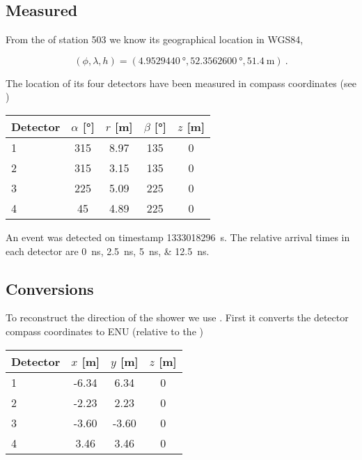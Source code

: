 \subsection{Measured}

From the \gps of station 503 we know its geographical location in WGS84,

\begin{equation}
    (\phi, \lambda, h) = (\SI{4.9529440}{\degree},
                          \SI{52.3562600}{\degree},
                          \SI{51.4}{\meter}) \ .
\end{equation}

The location of its four detectors have been measured in compass
coordinates (see )

\begin{center}
    \begin{tabular}{ l c c c c }
        \toprule
        Detector & $\alpha$ [\si{\degree}] & $r$ [\si{\meter}] &
        $\beta$ [\si{\degree}] & $z$ [\si{\meter}] \\
        \midrule
        1 & 315 & 8.97 & 135 & 0 \\
        2 & 315 & 3.15 & 135 & 0 \\
        3 & 225 & 5.09 & 225 & 0 \\
        4 &  45 & 4.89 & 225 & 0 \\
        \bottomrule
    \end{tabular}
\end{center}
                        
An event was detected on \gps timestamp \SI{1333018296}{\second}. The
relative arrival times in each detector are
\SIlist{0;2.5;5;12.5}{\nano\second}.


\subsection{Conversions}

To reconstruct the direction of the shower we use \sapphire. First it
converts the detector compass coordinates to ENU (relative to the \gps)


\begin{center}
    \begin{tabular}{ l c c c }
        \toprule
        Detector & $x$ [\si{\meter}] & $y$ [\si{\meter}] & $z$ [\si{\meter}] \\
        \midrule
        1 & -6.34 &  6.34 & 0 \\
        2 & -2.23 &  2.23 & 0 \\
        3 & -3.60 & -3.60 & 0 \\
        4 &  3.46 &  3.46 & 0 \\
        \bottomrule
    \end{tabular}
\end{center}


